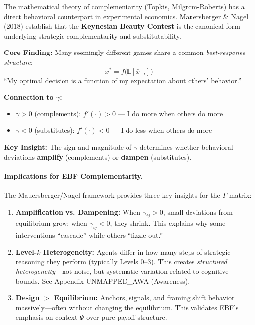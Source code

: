 The mathematical theory of complementarity (Topkis, Milgrom-Roberts) has a direct
behavioral counterpart in experimental economics. Mauersberger \& Nagel (2018)
establish that the \textbf{Keynesian Beauty Contest} is the canonical form underlying
strategic complementarity and substitutability.

\begin{tcolorbox}[colback=yellow!5!white, colframe=yellow!75!black,
    title=\textbf{Mauersberger \& Nagel (2018): Strategic Complementarity in Action}]

\textbf{Core Finding:}
Many seemingly different games share a common \textit{best-response structure}:
\[
x^* = f\bigl(\mathbb{E}[\bar{x}_{-i}]\bigr)
\]
``My optimal decision is a function of my expectation about others' behavior.''

\textbf{Connection to $\gamma$:}
\begin{itemize}[nosep]
    \item $\gamma > 0$ (complements): $f'(\cdot) > 0$ --- I do more when others do more
    \item $\gamma < 0$ (substitutes): $f'(\cdot) < 0$ --- I do less when others do more
\end{itemize}

\textbf{Key Insight:} The sign and magnitude of $\gamma$ determines whether
behavioral deviations \textbf{amplify} (complements) or \textbf{dampen} (substitutes).

\end{tcolorbox}

\paragraph{Implications for EBF Complementarity.}
The Mauersberger/Nagel framework provides three key insights for the $\Gamma$-matrix:

\begin{enumerate}[nosep]
    \item \textbf{Amplification vs. Dampening:} When $\gamma_{ij} > 0$, small deviations
    from equilibrium grow; when $\gamma_{ij} < 0$, they shrink. This explains why
    some interventions ``cascade'' while others ``fizzle out.''

    \item \textbf{Level-$k$ Heterogeneity:} Agents differ in how many steps of
    strategic reasoning they perform (typically Levels 0--3). This creates
    \textit{structured heterogeneity}---not noise, but systematic variation
    related to cognitive bounds. See Appendix UNMAPPED_AWA (Awareness).

    \item \textbf{Design $>$ Equilibrium:} Anchors, signals, and framing shift
    behavior massively---often without changing the equilibrium. This validates
    EBF's emphasis on context $\Psi$ over pure payoff structure.
\end{enumerate}

